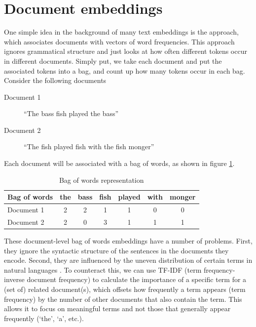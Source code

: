 \section{Document embeddings}

One simple idea in the background of many text embeddings is the  approach, which associates documents with vectors of word frequencies. This approach ignores grammatical structure and just looks at how often different tokens occur in different documents.  Simply put, we take each document and put the associated tokens into a bag, and count up how many tokens occur in each bag. Consider the following documents

\begin{description}
\item[Document 1]  ``The bass fish played the bass''
\item[Document 2]  ``The fish played fish with the fish monger''
\end{description}

Each document will be associated with a bag of words, as shown in figure \ref{exampleBags}.

\begin{table}[h]
    \centering
    \begin{tabular}{|l|c|c|c|c|c|c|}
    \hline
    Bag of words & the & bass & fish & played & with & monger \\
    \hline
    Document 1 & 2 & 2 & 1 & 1 & 0 & 0 \\
    Document 2 & 2 & 0 & 3 & 1 & 1 & 1 \\
    \hline
    \end{tabular}
    \caption{Bag of words representation}
    \label{exampleBags}
\end{table}
These document-level bag of words embeddings have a number of problems. First, they ignore the syntactic structure of the sentences in the documents they encode.  Second, they are influenced by the uneven distribution of certain terms in natural languages \cite{piantadosi2014zipf, zipf1945meaning}. To counteract this, we can use TF-IDF (term frequency-inverse document frequency) to calculate the importance of a specific term for a (set of) related document(s), which offsets how frequently a term appears (term frequency) by the number of other documents that also contain the term. This allows it to focus on meaningful terms and not those that generally appear frequently (`the', `a', etc.). 


